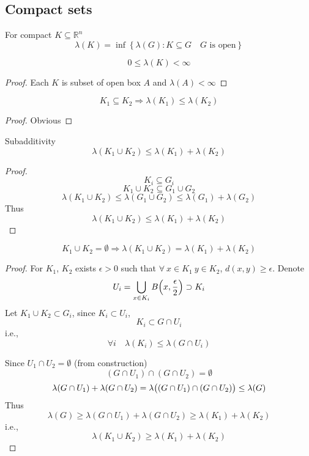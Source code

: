 \subsection{Compact sets}
\begin{definition}
	For compact $K \subseteq \mathbb{R}^n$
	$$\lambda(K) = \inf \left\{ \lambda(G) : K\subseteq G \quad G \text{ is open} \right\}$$
\end{definition}
\begin{prop}
	$$0 \leq \lambda(K) < \infty$$
\end{prop}
\begin{proof}
	Each $K$ is subset of open box $A$ and $\lambda(A) < \infty$
\end{proof}
\begin{prop}
	$$K_1 \subseteq K_2 \Rightarrow \lambda(K_1) \leq \lambda(K_2)$$
\end{prop}
\begin{proof}
	Obvious
\end{proof}
\begin{prop}
	Subadditivity
	$$\lambda(K_1 \cup K_2) \leq \lambda(K_1) + \lambda(K_2)$$
\end{prop}
\begin{proof}
$$K_i \subseteq G_i$$
$$K_1 \cup K_2 \subseteq G_1 \cup G_2$$
$$\lambda(K_1 \cup K_2) \leq \lambda(G_1 \cup G_2) \leq \lambda(G_1) + \lambda( G_2)$$
Thus
$$\lambda(K_1 \cup K_2) \leq \lambda(K_1) + \lambda(K_2)$$
\end{proof}
\begin{prop}
	$$K_1 \cup K_2 = \emptyset \Rightarrow \lambda(K_1 \cup K_2) = \lambda(K_1) + \lambda(K_2)$$
\end{prop}
\begin{proof}
For $K_1$, $K_2$ exists $\epsilon>0$ such that $\forall \: x \in K_1 \: y \in K_2$, $d(x,y)\geq\epsilon$. Denote 
$$U_i = \bigcup_{x\in K_i} B\qty(x, \frac{\epsilon}{2}) \supset K_i$$
Let $K_1 \cup K_2 \subset G_i$, since  $K_i \subset U_i$, 
$$K_i \subset G \cap U_i$$
i.e.,
$$\forall i \quad \lambda(K_i) \leq \lambda(G\cap U_i)$$

Since $U_1 \cap U_2 = \emptyset$ (from construction)
$$(G\cap U_1) \cap (G \cap U_2) = \emptyset$$
$$\lambda(G\cap U_1) + \lambda (G \cap U_2) = \lambda \qty\big((G\cap U_1) \cap (G \cap U_2)) \leq \lambda(G)$$
Thus
$$\lambda(G) \geq \lambda(G\cap U_1) + \lambda (G \cap U_2) \geq \lambda(K_1)+\lambda(K_2)$$
i.e.,
$$\lambda(K_1\cup K_2) \geq \lambda(K_1)+\lambda(K_2)$$
\end{proof}

